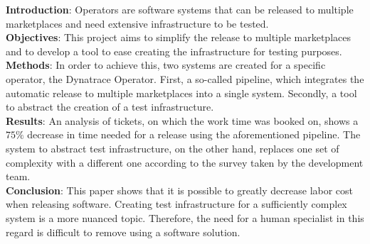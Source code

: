 \textbf{Introduction}:
Operators are software systems that can be released to multiple marketplaces and need extensive infrastructure to be tested. \\
\textbf{Objectives}:
This project aims to simplify the release to multiple marketplaces and to develop a tool to ease creating the infrastructure for testing purposes. \\
\textbf{Methods}:
In order to achieve this, two systems are created for a specific operator, the Dynatrace Operator.
First, a so-called pipeline, which integrates the automatic release to multiple marketplaces into a single system.
Secondly, a tool to abstract the creation of a test infrastructure. \\
\textbf{Results}:
An analysis of tickets, on which the work time was booked on, shows a $75 \%$ decrease in time needed for a release using the aforementioned pipeline.
The system to abstract test infrastructure, on the other hand, replaces one set of complexity with a different one according to the survey taken by the development team. \\
\textbf{Conclusion}:
This paper shows that it is possible to greatly decrease labor cost when releasing software.
Creating test infrastructure for a sufficiently complex system is a more nuanced topic.
Therefore, the need for a human specialist in this regard is difficult to remove using a software solution.

